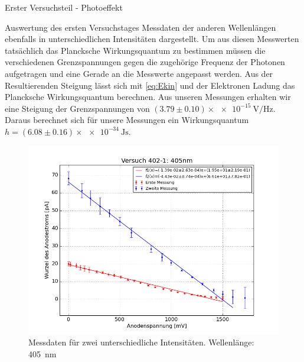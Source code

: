 \documentclass[pdftex, a4paper,11pt, twoside, ngerman]{report}
\begin{document}
\begin{chapter}{Erster Versuchsteil - Photoeffekt}
\begin{section}{Auswertung des ersten Versuchstages}
      Messdaten der anderen Wellenlängen ebenfalls in unterschiedlichen
      Intensitäten dargestellt. Um aus diesen Messwerten tatsächlich das
      Plancksche Wirkungsquantum zu bestimmen müssen die verschiedenen
      Grenzspannungen gegen die zugehörige Frequenz der Photonen aufgetragen
      und eine Gerade an die Messwerte angepasst werden. Aus der
      Resultierenden Steigung lässt sich mit \cref{eq:Ekin} und der Elektronen
      Ladung das Plancksche Wirkungsquantum berechnen. Aus unseren Messungen
      erhalten wir eine Steigung der Grenzspannungen von
      $(3.79\pm0.10)\times\SI{e-15}{\volt\per\hertz}$. Daraus berechnet sich 
      für unsere Messungen ein Wirkungsquantum 
      $h=(6.08 \pm 0.16)\times\SI{e-34}{\joule\second}$.
     
      \begin{figure}[htbp]
        \centering
        \begin{minipage}{0.48\textwidth}
          \centering
          \includegraphics[width=\textwidth]{Figures/Versuch402_1_405.png}
          \caption{Messdaten für zwei unterschiedliche Intensitäten.
              Wellenlänge: \SI{405}{\nano\meter}}
          \label{fig:Versuch402_1_405}
        \end{minipage}\quad
        \begin{minipage}{0.48\textwidth}
          \centering

\end{minipage}
\end{figure}
\end{section}
\end{chapter}
\end{document}
